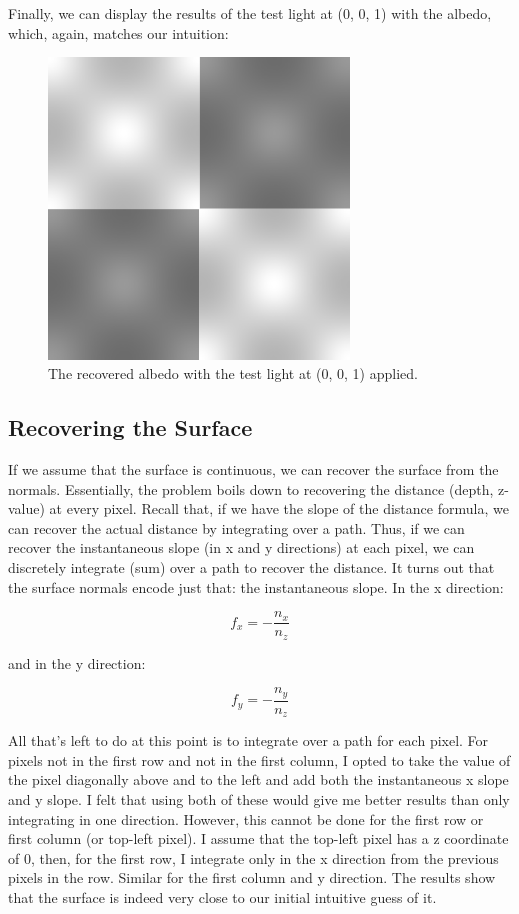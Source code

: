 \documentclass{article}
\begin{document}
Finally, we can display the results of the test light at (0, 0, 1) with the 
albedo, which, again, matches our intuition:

\begin{figure}[!ht]
	\centering
	\includegraphics[width=80mm]{figs/q1_test_light_albedo_output.png}
	\caption{The recovered albedo with the test light at (0, 0, 1) applied.}
\end{figure}

\subsection{Recovering the Surface}

If we assume that the surface is continuous, we can recover the surface from 
the normals. Essentially, the problem boils down to recovering the distance 
(depth, z-value) at every pixel. Recall that, if we have the slope of the 
distance formula, we can recover the actual distance by integrating over a path. 
Thus, if we can recover the instantaneous slope (in x and y directions) at each 
pixel, we can discretely integrate (sum) over a path to recover 
the distance. It turns out that the surface normals encode just that: the 
instantaneous slope. In the x direction:

$$
f_x = -\frac{n_x}{n_z}
$$

and in the y direction:

$$
f_y = -\frac{n_y}{n_z}
$$

All that's left to do at this point is to integrate over a path for each pixel. 
For pixels not in the first row and not in the first column, I opted to take the 
value of the pixel diagonally above and to the left and add both the 
instantaneous x slope and y slope. I felt that using both of these would give me 
better results than only integrating in one direction. However, this cannot 
be done for the first row or first column (or top-left pixel). I assume that the 
top-left pixel has a z coordinate of 0, then, for the first row, I integrate 
only in the x direction from the previous pixels in the row. Similar for the 
first column and y direction. The results show that the surface is indeed very 
close to our initial intuitive guess of it.
\end{document}

